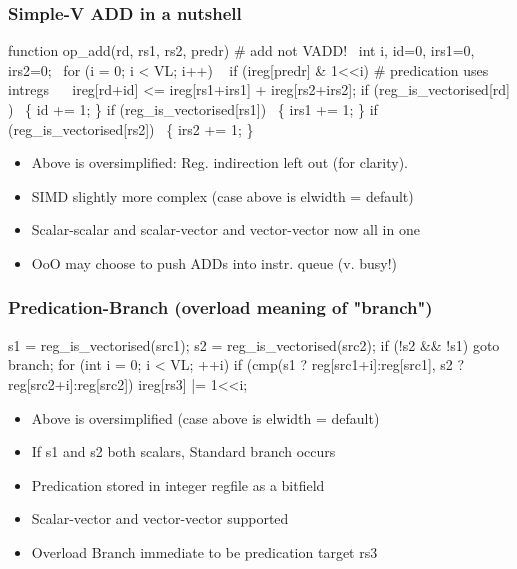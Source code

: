 \documentclass[slidestop]{beamer}
\begin{document}
\begin{frame}[fragile]
\frametitle{Simple-V ADD in a nutshell}

\begin{semiverbatim}
function op\_add(rd, rs1, rs2, predr) # add not VADD!
  int i, id=0, irs1=0, irs2=0;
  for (i = 0; i < VL; i++)
    if (ireg[predr] & 1<<i) # predication uses intregs
       ireg[rd+id] <= ireg[rs1+irs1] + ireg[rs2+irs2];
    if (reg\_is\_vectorised[rd] )  \{ id += 1; \}
    if (reg\_is\_vectorised[rs1])  \{ irs1 += 1; \}
    if (reg\_is\_vectorised[rs2])  \{ irs2 += 1; \}
\end{semiverbatim}

  \begin{itemize}
   \item Above is oversimplified: Reg. indirection left out (for clarity).
   \item SIMD slightly more complex (case above is elwidth = default)
   \item Scalar-scalar and scalar-vector and vector-vector now all in one
   \item OoO may choose to push ADDs into instr. queue (v. busy!)
  \end{itemize}
\end{frame}

\begin{frame}[fragile]
\frametitle{Predication-Branch (overload meaning of "branch")}

\begin{semiverbatim}
s1 = reg\_is\_vectorised(src1);
s2 = reg\_is\_vectorised(src2);
if (!s2 && !s1) goto branch;
for (int i = 0; i < VL; ++i)
  if (cmp(s1 ? reg[src1+i]:reg[src1],
          s2 ? reg[src2+i]:reg[src2])
         ireg[rs3] |= 1<<i;
\end{semiverbatim}

  \begin{itemize}
   \item Above is oversimplified (case above is elwidth = default)
   \item If s1 and s2 both scalars, Standard branch occurs
   \item Predication stored in integer regfile as a bitfield
   \item Scalar-vector and vector-vector supported
   \item Overload Branch immediate to be predication target rs3
  \end{itemize}
\end{frame}
\end{document}
